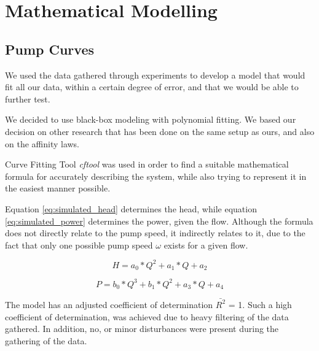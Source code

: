 \chapter{Mathematical Modelling}\label{ch:mathmodel}

\section{Pump Curves}\label{sec:pumpcurves}


We used the data gathered through experiments to develop a model that would fit all our data, within a certain degree of error, 
and that we would be able to further test.

We decided to use black-box modeling with polynomial fitting. We based our decision on other research that has been done on the same
setup as ours, and also on the affinity laws.

Curve Fitting Tool \cite{cftool} \textit{cftool} was used in order to find a suitable mathematical formula for accurately describing the 
system, while also trying to represent it in the easiest manner possible. 

Equation \ref{eq:simulated_head} determines the head, while equation \ref{eq:simulated_power} determines the power, given the flow. 
Although the formula does not directly relate to the pump speed, it indirectly relates to it, due to the fact that only one possible 
pump speed $\omega$ exists for a given flow.

\begin{equation}
	H = a_{0}*Q^2 + a_{1} * Q + a_{2}
	\label{eq:simulated_head} 
\end{equation}

\begin{equation}
	P = b_{0}*Q^3 + b_{1} * Q ^ 2 + a_{3} * Q + a_{4}
	\label{eq:simulated_power} 
\end{equation}


The model has an adjusted coefficient of determination  $\bar{R^2}$ = 1. Such a high coefficient of determination, was achieved due to
heavy filtering of the data gathered. In addition, no, or minor disturbances were present during the gathering of the data.


